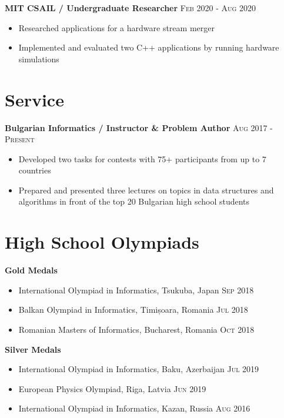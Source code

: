 \documentclass[letterpaper,11pt]{article}
\begin{document}
\textbf{MIT CSAIL / Undergraduate Researcher}
\hfill
\textsc{Feb 2020 - Aug 2020}
\begin{itemize}
    \item Researched applications for a hardware stream merger
    \item Implemented and evaluated two C++ applications by running hardware
        simulations
\end{itemize}

\section*{Service}
\textbf{Bulgarian Informatics / Instructor \& Problem Author}
\hfill
\textsc{Aug 2017 - Present}
\begin{itemize}
    \item Developed two tasks for contests with 75+ participants from up to 7
        countries
    \item Prepared and presented three lectures on topics in data structures and
        algorithms in front of the top 20 Bulgarian high school students
\end{itemize}

\section*{High School Olympiads}
\textbf{Gold Medals}
\begin{itemize}
    \item International Olympiad in Informatics, Tsukuba, Japan
        \hfill \textsc{Sep 2018}
    \item Balkan Olympiad in Informatics, Timișoara, Romania
        \hfill \textsc{Jul 2018}
    \item Romanian Masters of Informatics, Bucharest, Romania
        \hfill \textsc{Oct 2018}
\end{itemize}

\textbf{Silver Medals}
\begin{itemize}
    \item International Olympiad in Informatics, Baku, Azerbaijan
        \hfill \textsc{Jul 2019}
    \item European Physics Olympiad, Riga, Latvia
        \hfill \textsc{Jun 2019}
    \item International Olympiad in Informatics, Kazan, Russia
        \hfill \textsc{Aug 2016}
\end{itemize}
\end{document}
